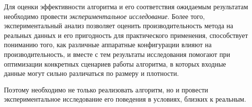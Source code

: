  Для оценки эффективности алгоритма и его соответствия ожидаемым результатам необходимо провести \textit{экспериментальное исследование}. Более того, экспериментальный анализ позволяет оценить производительность метода на реальных данных и его пригодность для практического применения, способствует пониманию того, как различные аппаратные конфигурации влияют на производительность, и вместе с тем результаты исследования помогают при оптимизации конкретных сценариев работы алгоритма, в которых входные данные могут сильно различаться по размеру и плотности. 

Поэтому необходимо не только реализовать алгоритм, но и провести экспериментальное исследование его поведения в условиях, близких к реальным.